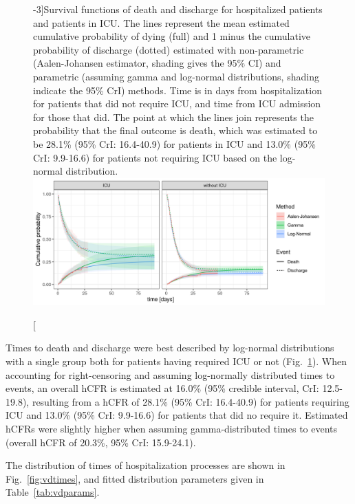 \begin{figure}[!htb]
    \centering
        \caption[Survival functions of death and discharge for hospitalized patients and patients in ICU][-3\baselineskip]{Survival functions of death and discharge for hospitalized patients and patients in ICU. The lines represent the mean estimated cumulative probability of dying (full) and 1 minus the cumulative probability of discharge (dotted) estimated with non-parametric (Aalen-Johansen estimator, shading gives the 95\% CI) and parametric (assuming gamma and log-normal distributions, shading indicate the 95\% CrI) methods. Time is in days from hospitalization for patients that did not require ICU, and time from ICU admission for those that did. The point at which the lines join represents the probability that the final outcome is death, which was estimated to be 28.1\% (95\% CrI: 16.4-40.9) for patients in ICU and 13.0\% (95\% CrI: 9.9-16.6) for patients not requiring ICU based on the log-normal distribution.}
    \includegraphics{fig_covid-switzerland-npi/fig_supp/survival_analaysis.png}
    \label{fig:delays}
\end{figure}


Times to death and discharge were best described by log-normal distributions with a single group both for patients having required ICU or not (Fig.~\ref{fig:delays}). When accounting for right-censoring and assuming log-normally distributed times to events, an overall hCFR is estimated at 16.0\% (95\% credible interval, CrI: 12.5-19.8), resulting from a hCFR of 28.1\% (95\% CrI: 16.4-40.9) for patients requiring ICU and 13.0\% (95\% CrI: 9.9-16.6) for patients that did no require it. Estimated hCFRs were slightly higher when assuming gamma-distributed times to events (overall hCFR of 20.3\%, 95\% CrI: 15.9-24.1).


\noindent The distribution of times of hospitalization processes are shown in Fig.~\ref{fig:vdtimes}, and fitted distribution parameters given in Table~\ref{tab:vdparams}.


